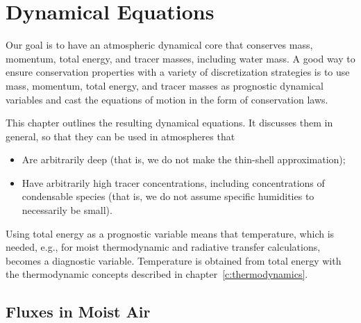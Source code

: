 \documentclass{report}
\begin{document}
\chapter{Dynamical Equations}\label{c:dynamical_equations}

Our goal is to have an atmospheric dynamical core that conserves mass, momentum, total energy, and tracer masses, including water mass. A good way to ensure conservation properties with a variety of discretization strategies is to use mass, momentum, total energy, and tracer masses as prognostic dynamical variables and cast the equations of motion in the form of conservation laws. 

This chapter outlines the resulting dynamical equations. It discusses them in general, so that they can be used in atmospheres that 
\begin{itemize}
\item Are arbitrarily deep (that is, we do not make the thin-shell approximation);
\item Have arbitrarily high tracer concentrations, including concentrations of condensable species (that is, we do not assume specific humidities to necessarily be small).
\end{itemize}
Using total energy as a prognostic variable means that temperature, which is needed, e.g., for moist thermodynamic and radiative transfer calculations, becomes a diagnostic variable. Temperature is obtained from total energy with the thermodynamic concepts described in chapter~\ref{c:thermodynamics}.

\section{Fluxes in Moist Air}
\end{document}
